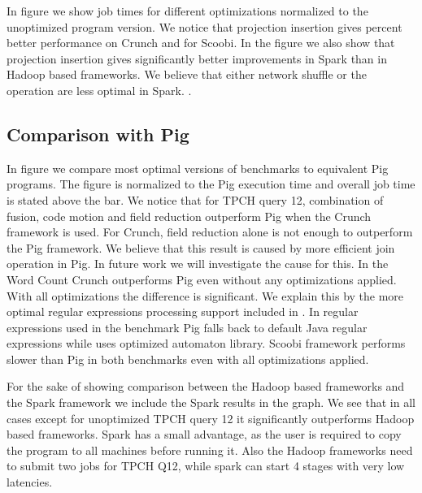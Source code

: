 In figure \todo{\ref{}} we show job times for different optimizations normalized to the unoptimized program version. We notice that projection insertion gives  percent better performance on Crunch and  for Scoobi. In the figure we also show that projection insertion gives significantly better improvements in Spark than in Hadoop based frameworks. We believe that either network shuffle or the  operation are less optimal in Spark. .


\subsection{Comparison with Pig}
\label{subsec:pig}

In figure \todo{\ref{}} we compare most optimal versions of benchmarks to equivalent Pig programs. The figure is normalized to the Pig execution time and overall job time is stated above the bar. We notice that for TPCH query 12, combination of fusion, code motion and field reduction outperform Pig when the Crunch framework is used. For Crunch, field reduction alone is not enough to outperform the Pig framework. We believe that this result is caused by more efficient join operation in Pig. In future work we will investigate the cause for this.
In the Word Count Crunch outperforms Pig even without any optimizations applied. With all optimizations the difference is significant. We explain this by the more optimal regular expressions processing support included in \tool. In regular expressions used in the benchmark Pig falls back to default Java regular expressions while \tool uses optimized automaton library. Scoobi framework performs slower than Pig in both benchmarks even with all optimizations applied.

For the sake of showing comparison between the Hadoop based frameworks and the Spark framework we include the Spark results in the graph. We see that in all cases except for unoptimized TPCH query 12 it significantly outperforms Hadoop based frameworks.  Spark has a small advantage, as the user is required to copy the program to all machines before running it. Also the Hadoop frameworks need to submit two jobs for TPCH Q12, while spark can start 4 stages with very low latencies.

